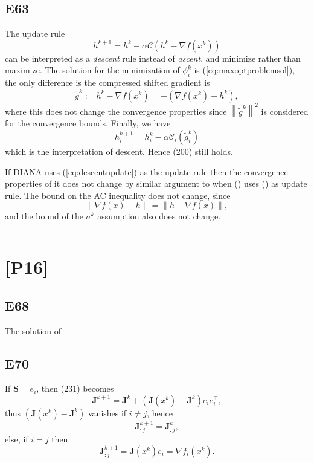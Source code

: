 \documentclass[12pt]{article}
\begin{document}
\subsection*{E63}
The update rule
\begin{equation}
    h^{k+1} = h^k - \alpha \mathcal{C}(h^k-\nabla f(x^k))
    \label{eq:descentupdate}
\end{equation}
can be interpreted as a \textit{descent} rule instead of \textit{ascent}, and minimize rather than maximize. The solution for the minimization of $\phi_i^k$ is (\ref{eq:maxoptproblemsol}), the only difference is the compressed shifted gradient is
\begin{equation*}
	\tilde{g}^k:= h^k - \nabla f(x^k) = -(\nabla f(x^k) - h^k),
\end{equation*}
where this does not change the convergence properties since $\left\|\tilde{g}^k\right\|^2$ is considered for the convergence bounds. Finally, we have
\begin{equation*}
	h_i^{k+1} = h_i^k - \alpha \mathcal{C}_i(\tilde{g}_i^k)
\end{equation*}
which is the interpretation of descent. Hence (200) still holds.

If DIANA uses (\ref{eq:descentupdate}) as the update rule then the convergence properties of it does not change by similar argument to when () uses () as update rule. The bound on the AC inequality does not change, since
\begin{equation*}
	\left\| \nabla f(x) - h \right\| = \left\| h - \nabla f(x) \right\|,
\end{equation*}
and the bound of the $\sigma^k$ assumption also does not change.
\vspace{0.1cm}

\hrule
\vspace{0.1cm}
\section*{[P16]}
\subsection*{E68}
The solution of 
\subsection*{E70}
If $\mathbf{S} = e_i$, then (231) becomes
\begin{equation*}
    \mathbf{J}^{k+1} = \mathbf{J}^k + \left( \mathbf{J}(x^k) - \mathbf{J}^k \right)e_ie_i^\top,
\end{equation*}
thus $\left( \mathbf{J}(x^k) - \mathbf{J}^k \right)$ vanishes if $i \neq j$, hence
\begin{equation*}
    \mathbf{J}_{:j}^{k+1} =  \mathbf{J}_{:j}^k,
\end{equation*}
else, if $i = j$ then
\begin{equation*}
    \mathbf{J}_{:j}^{k+1} = \mathbf{J}(x^k)e_i = \nabla f_i(x^k).
\end{equation*}
\end{document}
